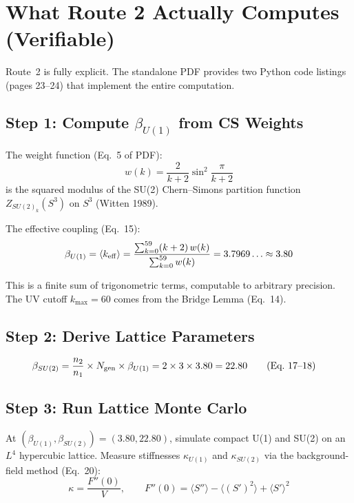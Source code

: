 \documentclass[12pt,a4paper]{article}
\begin{document}
\section{What Route 2 Actually Computes (Verifiable)}
\label{sec:route2}

Route~2 is fully explicit. The standalone PDF provides two Python
code listings (pages 23--24) that implement the entire computation.

\subsection{Step 1: Compute $\beta_{U(1)}$ from CS Weights}

The weight function (Eq.~5 of PDF):
\begin{equation}
w(k) = \frac{2}{k+2}\sin^2\!\frac{\pi}{k+2}
\end{equation}
is the squared modulus of the SU(2) Chern--Simons partition function
$Z_{SU(2)_k}(S^3)$ on $S^3$ (Witten 1989).

The effective coupling (Eq.~15):
\begin{equation}
\beta_{U(1)} = \langle k_{\rm eff}\rangle
= \frac{\sum_{k=0}^{59}(k+2)\,w(k)}{\sum_{k=0}^{59}w(k)}
= 3.7969\ldots \approx 3.80
\end{equation}

This is a finite sum of trigonometric terms, computable to arbitrary
precision. The UV cutoff $k_{\max} = 60$ comes from the Bridge Lemma
(Eq.~14).

\subsection{Step 2: Derive Lattice Parameters}

\begin{align}
\beta_{SU(2)} &= \frac{n_2}{n_1} \times N_{\rm gen} \times \beta_{U(1)}
= 2 \times 3 \times 3.80 = 22.80 \tag{Eq.~17--18}
\end{align}

\subsection{Step 3: Run Lattice Monte Carlo}

At $(\beta_{U(1)}, \beta_{SU(2)}) = (3.80, 22.80)$, simulate compact
U(1) and SU(2) on an $L^4$ hypercubic lattice. Measure stiffnesses
$\kappa_{U(1)}$ and $\kappa_{SU(2)}$ via the background-field method
(Eq.~20):
\begin{equation}
\kappa = \frac{F''(0)}{V}, \qquad
F''(0) = \langle S''\rangle - \langle (S')^2\rangle + \langle S'\rangle^2
\end{equation}
\end{document}
